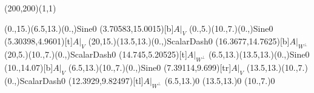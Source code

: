 \unitlength=1bp%

\begin{feynartspicture}(200,200)(1,1)

\FADiagram{}
\FAProp(0.,15.)(6.5,13.)(0.,){Sine}{0}
\FALabel(3.70583,15.0015)[b]{$A|_V$}
\FAProp(0.,5.)(10.,7.)(0.,){Sine}{0}
\FALabel(5.30398,4.9601)[t]{$A|_V$}
\FAProp(20,15.)(13.5,13.)(0.,){ScalarDash}{0}
\FALabel(16.3677,14.7625)[b]{$A|_{W^\perp}$}
\FAProp(20,5.)(10.,7.)(0.,){ScalarDash}{0}
\FALabel(14.745,5.20525)[t]{$A|_{W^\perp}$}
\FAProp(6.5,13.)(13.5,13.)(0.,){Sine}{0}
\FALabel(10.,14.07)[b]{$A|_V$}
\FAProp(6.5,13.)(10.,7.)(0.,){Sine}{0}
\FALabel(7.39114,9.699)[tr]{$A|_V$}
\FAProp(13.5,13.)(10.,7.)(0.,){ScalarDash}{0}
\FALabel(12.3929,9.82497)[tl]{$A|_{W^\perp}$}
\FAVert(6.5,13.){0}
\FAVert(13.5,13.){0}
\FAVert(10.,7.){0}
\end{feynartspicture}

